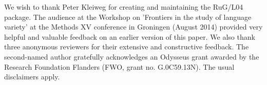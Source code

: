 \documentclass[output=paper]{LSP/langsci}
\begin{document}
We wish to thank Peter Kleiweg for creating and maintaining the RuG/L04 package. The audience at the Workshop on 'Frontiers in the study of language variety' at the Methods XV conference in Groningen (August 2014) provided very helpful and valuable feedback on an earlier version of this paper. We also thank three anonymous reviewers for their extensive and constructive feedback. The second-named author gratefully acknowledges an Odysseus grant awarded by the Research Foundation Flanders (FWO, grant no. G.0C59.13N). The usual disclaimers apply.


%

\printbibliography[heading=subbibliography,notkeyword=this]
\end{document}
